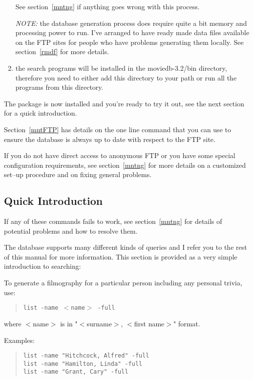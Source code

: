 \begin{enumerate}
See section~\ref{mntng} if anything goes wrong with this process.

{\em NOTE:\/} the database generation process does require quite a bit 
memory 
and processing power to run. I've arranged to have ready made data
files available on the FTP sites for people who have problems generating
them locally. See section~\ref{rmdf} for more details.
\item the search programs will be installed in the moviedb-3.2/bin 
directory,
therefore you need to either add this directory to your path or run
all the programs from this directory.
\end{enumerate}

The package is now installed and you're ready to try it out, see the next
section for a quick introduction.

Section~\ref{mntFTP} has details on the one line command that you can use 
to 
ensure the database is always up to date with respect to the FTP site.

If you do not have direct access to anonymous FTP or you have some special
configuration requirements, see section~\ref{mntng} for more details on a 
customized set--up procedure and on fixing general problems.

\subsection{Quick Introduction}

If any of these commands fails to work, see section~\ref{mntng} for 
details of potential problems and how to resolve them.

The database supports many different kinds of queries and I refer you to 
the
rest of this manual for more information. This section is provided as a 
very simple introduction to searching:

To generate a filmography for a particular person including any personal
trivia, use:
\begin{quote}
   {\tt list -name $<$name$>$ -full}
\end{quote}
where $<$name$>$ is in "$<$surname$>$, $<$first name$>$" format. 

Examples:
\begin{quote}
   {\tt list -name "Hitchcock, Alfred" -full}\\
   {\tt list -name "Hamilton, Linda" -full}\\
   {\tt list -name "Grant, Cary" -full}
\end{quote}

